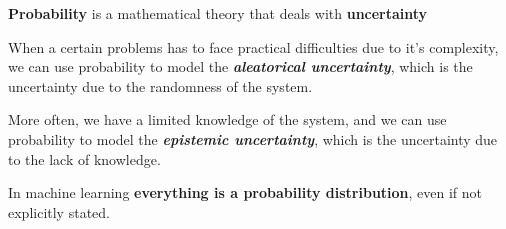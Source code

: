 \textbf{Probability} is a mathematical theory that deals with \textbf{uncertainty}

When a certain problems has to face practical difficulties due to it's complexity, we can use probability to model the \textbf{\textit{aleatorical uncertainty}}, which is the uncertainty due to the randomness of the system. 

More often, we have a limited knowledge of the system, and we can use probability to model the \textbf{\textit{epistemic uncertainty}}, which is the uncertainty due to the lack of knowledge.

\begin{tipsblock}
    In machine learning \textbf{everything is a probability distribution}, even if not explicitly stated.
\end{tipsblock}
